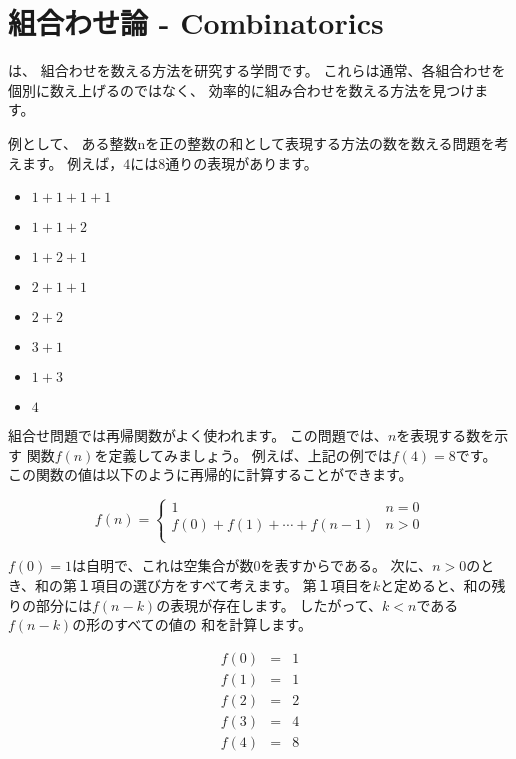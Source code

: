 \chapter{組合わせ論 - Combinatorics}


 は、
組合わせを数える方法を研究する学問です。
これらは通常、各組合わせを個別に数え上げるのではなく、
効率的に組み合わせを数える方法を見つけます。

例として、
ある整数nを正の整数の和として表現する方法の数を数える問題を考えます。
例えば，$4$には8通りの表現があります。

\begin{multicols}{2}
\begin{itemize}
\item $1+1+1+1$
\item $1+1+2$
\item $1+2+1$
\item $2+1+1$
\item $2+2$
\item $3+1$
\item $1+3$
\item $4$
\end{itemize}
\end{multicols}

組合せ問題では再帰関数がよく使われます。
この問題では、$n$を表現する数を示す
関数$f(n)$を定義してみましょう。
例えば、上記の例では$f(4)=8$です。
この関数の値は以下のように再帰的に計算することができます。

\begin{equation*}
    f(n) = \begin{cases}
               1               & n = 0\\
               f(0)+f(1)+\cdots+f(n-1) & n > 0\\
           \end{cases}
\end{equation*}

$f(0)=1$は自明で、これは空集合が数0を表すからである。
次に、$n > 0$のとき、和の第１項目の選び方をすべて考えます。
第１項目を$k$と定めると、和の残りの部分には$f (n - k)$の表現が存在します。
したがって、$k < n$である$f (n - k)$の形のすべての値の 和を計算します。

\[
\begin{array}{lcl}
f(0) & = & 1 \\
f(1) & = & 1 \\
f(2) & = & 2 \\
f(3) & = & 4 \\
f(4) & = & 8 \\
\end{array}
\]

